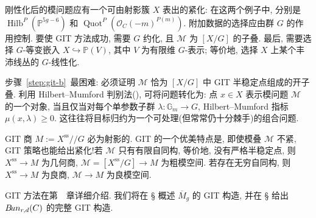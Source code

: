 刚性化后的模问题应有一个可由射影簇 $X$ 表出的紧化: 在这两个例子中, 分别是 $\operatorname{Hilb}^P(\mathbb P^{5g-6})$ 和 $\operatorname{Quot}^P(\mathcal O_C(-m)^{P(m)})$. 附加数据的选择应由群 $G$ 的作用控制. 要使 GIT 方法成功, 需要 $G$ 约化, 且 $\mathcal M$ 为 $[X/G]$ 的子叠. 最后, 需要选择 $G$-等变嵌入 $X\hookrightarrow\mathbb P(V)$, 其中 $V$ 为有限维 $G$-表示; 等价地, 选择 $X$ 上某个丰沛线丛的 $G$-线性化.

步骤~\ref{step:git-b}~最困难: 必须证明 $\mathcal M$ 恰为 $[X/G]$ 中 GIT 半稳定点组成的开子叠. 利用 Hilbert--Mumford 判别法(), 可将问题转化为: 点 $x\in X$ 表示模问题 $\mathcal M$ 的一个对象, 当且仅当对每个单参数子群 $\lambda:\mathbb G_m\to G$, Hilbert--Mumford 指标 $\mu(x,\lambda)\geq0$. 这往往将目标归约为一个可处理(但常常仍十分棘手)的组合问题.

GIT 商 $M:=X^{\mathrm{ss}}/\!/G$ 必为射影的. GIT 的一个优美特点是, 即使模叠 $\mathcal M$ 不紧, GIT 策略也能给出紧化!若 $\mathcal M$ 只有有限自同构, 等价地, 没有严格半稳定点, 则 $X^{\mathrm{ss}}\to M$ 为几何商, $\mathcal M=[X^{\mathrm{ss}}/G]\to M$ 为粗模空间. 若存在无穷自同构, 则 $X^{\mathrm{ss}}\to M$ 为良商, $\mathcal M\to M$ 为良模空间.

GIT 方法在第~~章详细介绍. 我们将在 \S{} 概述 $\overline M_g$ 的 GIT 构造, 并在 \S{} 给出 $B\!un_{r,d}(C)$ 的完整 GIT 构造.

